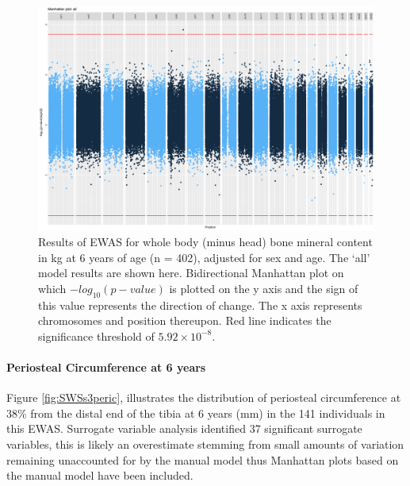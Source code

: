 \documentclass[
]{book}
\begin{document}
\begin{figure}

{\centering \includegraphics[width=0.8\linewidth]{figs/SWSstotbmcwhasaEPICewasManhattanAll} 

}

\caption{Results of EWAS for whole body (minus head) bone mineral content in kg at 6 years of age (n = 402), adjusted for sex and age. The `all' model results are shown here. Bidirectional Manhattan plot on which \(-log_{10}(p-value)\) is plotted on the y axis and the sign of this value represents the direction of change. The x axis represents chromosomes and position thereupon. Red line indicates the significance threshold of \(5.92\times10^{-8}\).}\label{fig:SWSstotbmcwhasaEPICewasManhattanSVA}
\end{figure}



\hypertarget{periosteal-circumference-at-6-years}{%
\paragraph{Periosteal Circumference at 6 years}\label{periosteal-circumference-at-6-years}}

Figure \ref{fig:SWSs3peric}, illustrates the distribution of periosteal circumference at 38\% from the distal end of the tibia at 6 years (mm) in the 141 individuals in this EWAS.
Surrogate variable analysis identified 37 significant surrogate variables, this is likely an overestimate stemming from small amounts of variation remaining unaccounted for by the manual model thus Manhattan plots based on the manual model have been included.
\end{document}
